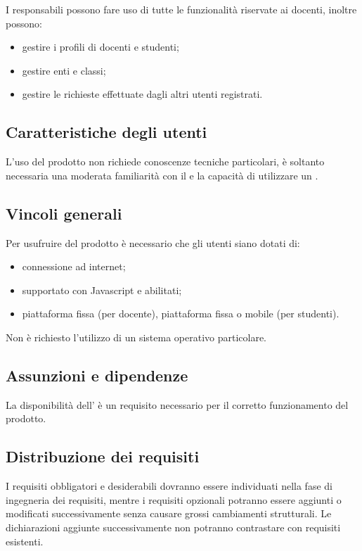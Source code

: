 \documentclass[a4paper, titlepage]{article}
\begin{document}
\bigskip

I responsabili possono fare uso di tutte le funzionalità riservate ai docenti, inoltre possono:
\begin{itemize}
\item gestire i profili di docenti e studenti;
\item gestire enti e classi;
\item gestire le richieste effettuate dagli altri utenti registrati.
\end{itemize}

\subsection{Caratteristiche degli utenti}
L'uso del prodotto non richiede conoscenze tecniche particolari, è soltanto necessaria una moderata familiarità con il  e la capacità di utilizzare un .

\subsection{Vincoli generali}
Per usufruire del prodotto è necessario che gli utenti siano dotati di:
\begin{itemize}
\item connessione ad internet;
\item {} supportato con Javascript e  abilitati;
\item piattaforma fissa (per docente), piattaforma fissa o mobile (per studenti).
\end{itemize}

\bigskip

Non è richiesto l'utilizzo di un sistema operativo particolare.

\subsection{Assunzioni e dipendenze}
La disponibilità dell' è un requisito necessario per il corretto funzionamento del prodotto.

\subsection{Distribuzione dei requisiti}
I requisiti obbligatori e desiderabili dovranno essere individuati nella fase di ingegneria dei requisiti, mentre i requisiti opzionali potranno essere aggiunti o modificati successivamente senza causare grossi cambiamenti strutturali. Le dichiarazioni aggiunte successivamente non potranno contrastare con requisiti esistenti.
\end{document}
